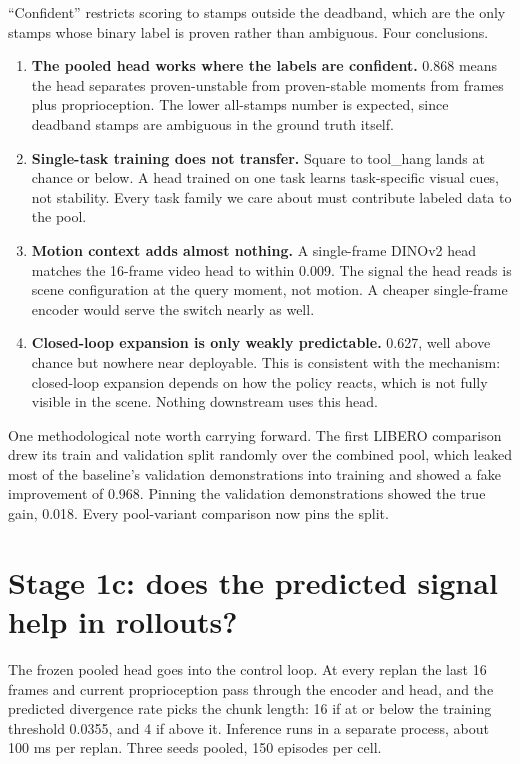 \documentclass[11pt]{article}
\begin{document}
``Confident'' restricts scoring to stamps outside the deadband, which are the
only stamps whose binary label is proven rather than ambiguous. Four
conclusions.

\begin{enumerate}[leftmargin=1.6em]
\item \textbf{The pooled head works where the labels are confident.} 0.868
means the head separates proven-unstable from proven-stable moments from
frames plus proprioception. The lower all-stamps number is expected, since
deadband stamps are ambiguous in the ground truth itself.
\item \textbf{Single-task training does not transfer.} Square to tool\_hang
lands at chance or below. A head trained on one task learns task-specific
visual cues, not stability. Every task family we care about must contribute
labeled data to the pool.
\item \textbf{Motion context adds almost nothing.} A single-frame DINOv2 head
matches the 16-frame video head to within 0.009. The signal the head reads is
scene configuration at the query moment, not motion. A cheaper single-frame
encoder would serve the switch nearly as well.
\item \textbf{Closed-loop expansion is only weakly predictable.} 0.627, well
above chance but nowhere near deployable. This is consistent with the
mechanism: closed-loop expansion depends on how the policy reacts, which is
not fully visible in the scene. Nothing downstream uses this head.
\end{enumerate}

One methodological note worth carrying forward. The first LIBERO comparison
drew its train and validation split randomly over the combined pool, which
leaked most of the baseline's validation demonstrations into training and
showed a fake improvement of 0.968. Pinning the validation demonstrations
showed the true gain, 0.018. Every pool-variant comparison now pins the
split.

\section{Stage 1c: does the predicted signal help in rollouts?}

The frozen pooled head goes into the control loop. At every replan the last
16 frames and current proprioception pass through the encoder and head, and
the predicted divergence rate picks the chunk length: 16 if at or below the
training threshold 0.0355, and 4 if above it. Inference runs in a separate
process, about 100 ms per replan. Three seeds pooled, 150 episodes per cell.
\end{document}
